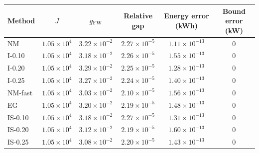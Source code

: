 \begin{tabular}{lccccc}
\toprule
Method & $J$ & $g_{\rm FW}$ & Relative gap & Energy error (kWh) & Bound error (kW) \\
\midrule
NM & $1.05\times10^{4}$ & $3.22\times10^{-2}$ & $2.27\times10^{-5}$ & $1.11\times10^{-13}$ & $0$ \\
I-0.10 & $1.05\times10^{4}$ & $3.18\times10^{-2}$ & $2.26\times10^{-5}$ & $1.55\times10^{-13}$ & $0$ \\
I-0.20 & $1.05\times10^{4}$ & $3.29\times10^{-2}$ & $2.25\times10^{-5}$ & $1.28\times10^{-13}$ & $0$ \\
I-0.25 & $1.05\times10^{4}$ & $3.27\times10^{-2}$ & $2.24\times10^{-5}$ & $1.40\times10^{-13}$ & $0$ \\
NM-fast & $1.05\times10^{4}$ & $3.03\times10^{-2}$ & $2.10\times10^{-5}$ & $1.56\times10^{-13}$ & $0$ \\
EG & $1.05\times10^{4}$ & $3.20\times10^{-2}$ & $2.19\times10^{-5}$ & $1.48\times10^{-13}$ & $0$ \\
\midrule
IS-0.10 & $1.05\times10^{4}$ & $3.18\times10^{-2}$ & $2.27\times10^{-5}$ & $1.31\times10^{-13}$ & $0$ \\
IS-0.20 & $1.05\times10^{4}$ & $3.12\times10^{-2}$ & $2.19\times10^{-5}$ & $1.60\times10^{-13}$ & $0$ \\
IS-0.25 & $1.05\times10^{4}$ & $3.08\times10^{-2}$ & $2.20\times10^{-5}$ & $1.43\times10^{-13}$ & $0$ \\
\bottomrule
\end{tabular}
